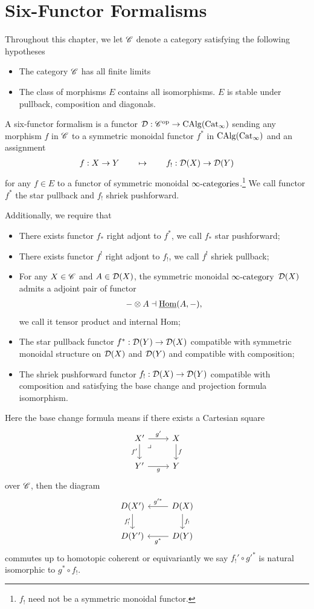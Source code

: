 \chapter{Six-Functor Formalisms}

Throughout this chapter, we let $\mathscr{C}$ denote a category satisfying the following hypotheses
\begin{itemize}
    \item[a.] The category $\mathscr{C}$ has all finite limits 
    \item[b.] The class of morphisms $E$ contains all isomorphisms. $E$ is stable under pullback, composition and diagonals.
\end{itemize} 

A six-functor formalism is a functor $\mathcal{D}:\mathscr{C}^{\mathrm{op}} \to \operatorname{CAlg}(\mathrm{Cat}_\infty)$ sending any morphism $f$ in $
\mathscr{C}$ to a symmetric monoidal functor $f^*$ in $\operatorname{CAlg}(\mathrm{Cat}_\infty)$ and an assignment
\begin{align*}
    f:X\to Y \qquad \mapsto \qquad f_!:\mathcal{D}(X)\to \mathcal{D}(Y)
\end{align*}
for any $f\in E$ to a functor of symmetric monoidal $\infty\text{-categories}$.\footnote{$f_!$ need not be a symmetric monoidal functor.}
We call functor $f^*$ the star pullback and $f_!$ shriek pushforward.

Additionally, we require that 
\begin{itemize}
    \item[1] There exists functor $f_*$ right adjont to $f^*$, we call $f_*$ star pushforward;
    \item[2] There exists functor $f^!$ right adjont to $f_!$, we call $f^!$ shriek pullback;
    \item[3] For any $X\in\mathscr{C}$ and $A\in \mathcal{D}(X)$, the symmetric monoidal $\infty\text{-category}$ $\mathcal{D}(X)$ admits a adjoint pair of functor 
    \begin{align*}
         - \otimes A \dashv \underline{\operatorname{Hom}}(A,-),
    \end{align*} 
    we call it tensor product and internal Hom;
    \item[4] The star pullback functor $f^*:\mathcal{D}(Y)\to \mathcal{D}(X)$ compatible with symmetric monoidal structure on $\mathcal{D}(X)$ and $\mathcal{D}(Y)$ and compatible with composition;
    \item[5] The shriek pushforward functor $f_!: \mathcal{D}(X)\to \mathcal{D}(Y)$ compatible with composition and satisfying the base change and projection formula isomorphism.
\end{itemize}
 
Here the base change formula means if there exists a Cartesian square 
\[
\begin{tikzcd}
X' \arrow[r, "g'"] \arrow[d, "f'"'] 
  \arrow[dr, phantom, "\lrcorner", very near start]
& X \arrow[d, "f"] \\
Y' \arrow[r, "g"'] & Y
\end{tikzcd}
\]
over $\mathscr{C}$, then the diagram 
\[
\begin{tikzcd}
D(X') \arrow[d, "f'_!"'] 
& D(X) \arrow[l, "g'^*"'] \arrow[d, "f_!"] \\
D(Y') 
& D(Y) \arrow[l, "g^*"]
\end{tikzcd}
\]
commutes up to homotopic coherent or equivariantly we say $f_!'\circ g'^*$ is natural isomorphic to $g^*\circ f_!$.

